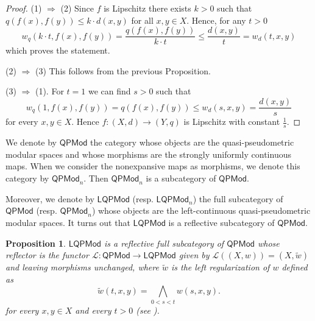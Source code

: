 \documentclass[11pt,a4paper]{amsart}
\newtheorem{proposition}[theorem]{Proposition}
\theoremstyle{definition}
\begin{document}
	\begin{proof}
		(1) $\Rightarrow$ (2) Since $f$ is Lipschitz there exists $k>0$ such that $q(f(x),f(y))\leq k\cdot d(x,y)$ for all $x,y\in X.$ Hence, for any $t>0$
		$$w_q(k\cdot t,f(x),f(y))=\frac{q(f(x),f(y))}{k\cdot t}\leq \frac{d(x,y)}{t}=w_d(t,x,y)$$
		which proves the statement.
		
		(2) $\Rightarrow$ (3) This follows from the previous Proposition.
		
		(3) $\Rightarrow$ (1). For $t=1$ we can find $s>0$ such that
		$$w_q(1,f(x),f(y))=q(f(x),f(y))\leq w_d(s,x,y)=\frac{d(x,y)}{s}$$
		for every $x,y\in X.$ Hence $f:(X,d)\to (Y,q)$ is Lipschitz with constant $\tfrac{1}
		{s}.$
	\end{proof}
	
	We denote by $\mathsf{QPMod}$ the category whose objects are
	the quasi-pseudometric modular spaces and whose morphisms are the strongly uniformly continuous maps. When we consider the nonexpansive maps as morphisms, we denote this category by $\mathsf{QPMod}_n$. Then $\mathsf{QPMod}_n$ is a subcategory of $\mathsf{QPMod}$.
	
	Moreover, we denote by $\mathsf{LQPMod}$ (resp. $\mathsf{LQPMod}_n$) the full subcategory of $\mathsf{QPMod}$ (resp. $\mathsf{QPMod}_n$) whose objects are the left-continuous quasi-pseudometric modular spaces. It turns out that $\mathsf{LQPMod}$  is a reflective subcategory of $\mathsf{QPMod}$.
	
	\begin{proposition}
		$\mathsf{LQPMod}$ is a reflective full subcategory of $\mathsf{QPMod}$ whose reflector is the functor $\mathscr{L}:\mathsf{QPMod}\to\mathsf{LQPMod}$ given by $\mathscr{L}((X,w))=(X,\widetilde{w})$ and leaving morphisms unchanged, where $\widetilde{w}$ is the left regularization of $w$ defined as
		$$\widetilde{w}(t,x,y)=\bigwedge_{0<s<t} w(s,x,y).$$
		for every $x,y\in X$ and every $t>0$ {\rm(}see \cite[Definition 1.2.4]{Chis15}{\rm)}.
	\end{proposition}
	
\end{document}
